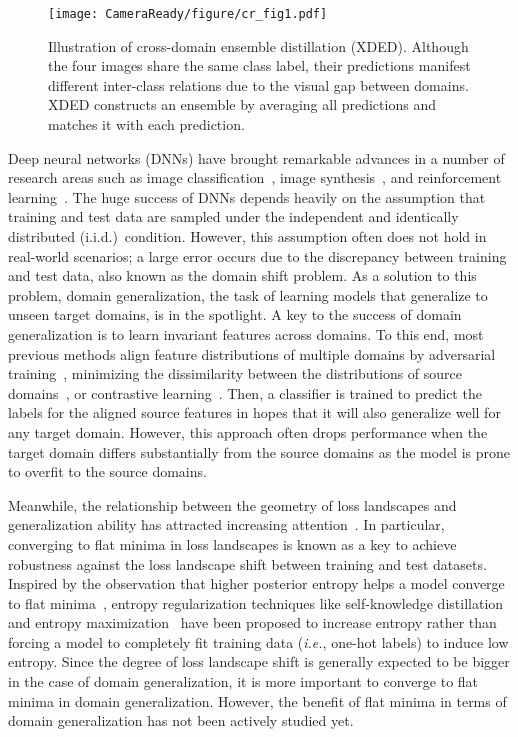 \documentclass[runningheads]{llncs}
\def\ie{\emph{i.e.}}
\begin{document}
\begin{figure*}[t]
    \centering
    \texttt{[image: CameraReady/figure/cr\_fig1.pdf]}
    \caption{Illustration of cross-domain ensemble distillation (XDED). Although the four images share the same class label, their predictions manifest different inter-class relations due to the visual gap between domains. XDED constructs an ensemble by averaging all predictions and matches it with each prediction.
}
    \label{fig:teaser}
\end{figure*}

Deep neural networks (DNNs) have brought remarkable advances in a number of research areas such as image classification~\cite{Alexnet}, image synthesis~\cite{goodfellow2014generative}, and reinforcement learning~\cite{mnih2013playing}. The huge success of DNNs depends heavily on the assumption that training and test data are sampled under the independent and identically distributed (i.i.d.)~condition. However, this assumption often does not hold in real-world scenarios; a large error occurs due to the discrepancy between training and test data, also known as the domain shift problem. As a solution to this problem, domain generalization, the task of learning models that generalize to unseen target domains, is in the spotlight.
A key to the success of domain generalization is to learn invariant features across domains. To this end, most previous methods align feature distributions of multiple domains by adversarial training~\cite{li2018domain,li2018deep}, minimizing the dissimilarity between the distributions of source domains~\cite{muandet2013domain}, or contrastive learning~\cite{kim2021selfreg}. Then, a classifier is trained to predict the labels for the aligned source features in hopes that it will also generalize well for any target domain. 
However, this approach often drops performance when the target domain differs substantially from the source domains as the model is prone to overfit to the source domains.


Meanwhile, the relationship between the geometry of loss landscapes and generalization ability has attracted increasing attention~\cite{dziugaite2017computing,foret2021sharpness,jiang2020fantastic,keskar2016large}.
In particular, converging to flat minima in loss landscapes is known as a key to achieve robustness against the
loss landscape shift between training and test datasets. 
Inspired by the observation that higher posterior entropy helps a model converge to flat minima~\cite{chaudhari2017entropy,pereyra2017regularizing,zhang2018deep}, entropy regularization techniques like self-knowledge distillation~\cite{zhang2019your} and entropy maximization~\cite{cha2020cpr} have been proposed to increase entropy rather than forcing a model to completely fit training data (\ie, one-hot labels) to induce low entropy.
Since the degree
of loss landscape shift is generally expected to be bigger in the case of domain generalization, it is more important to converge to flat minima 
in domain generalization.
However, the benefit of flat minima in terms of domain generalization has not been actively studied yet.
\end{document}
